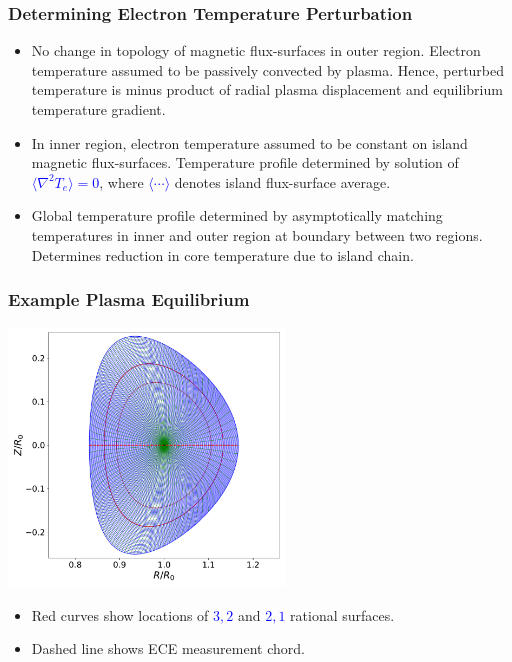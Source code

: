 \documentclass{beamer}
\begin{document}
\begin{frame}
\frametitle{Determining Electron Temperature Perturbation}
 
\begin{itemize}
\item No change in topology of magnetic flux-surfaces in outer region. Electron temperature assumed to be passively convected by plasma. Hence,
perturbed temperature is minus product of radial plasma displacement and equilibrium temperature gradient.
\item In inner region, electron temperature assumed to be constant on island magnetic flux-surfaces. Temperature profile determined by solution of \textcolor{blue}{$\langle \nabla^2 T_e\rangle=0$}, where
\textcolor{blue}{$\langle\cdots\rangle$} denotes island  flux-surface average.
\item Global temperature profile determined by asymptotically matching temperatures in inner and outer region at boundary between two regions. Determines reduction in core temperature due to island chain.
\end{itemize}

\end{frame}

\begin{frame}
\frametitle{Example Plasma Equilibrium}
 
\begin{center}
\includegraphics[width=0.55\textwidth]{../Fig1.pdf}
\end{center}
\begin{itemize}
\item Red curves show locations of \textcolor{blue}{$3,2$} and \textcolor{blue}{$2,1$} rational surfaces. 
\item Dashed line shows ECE measurement chord. 
\end{itemize}
\end{frame}
\end{document}
